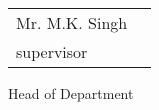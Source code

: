 \\
\begin{minipage}[t]{0.75\linewidth}
\begin{tabular}{ll}
Mr. M.K. Singh\\
supervisor 
\end{tabular} 
\end{minipage}
\begin{minipage}[t]{0.75\linewidth}
Head of Department
\end{minipage}
\thispagestyle{empty}